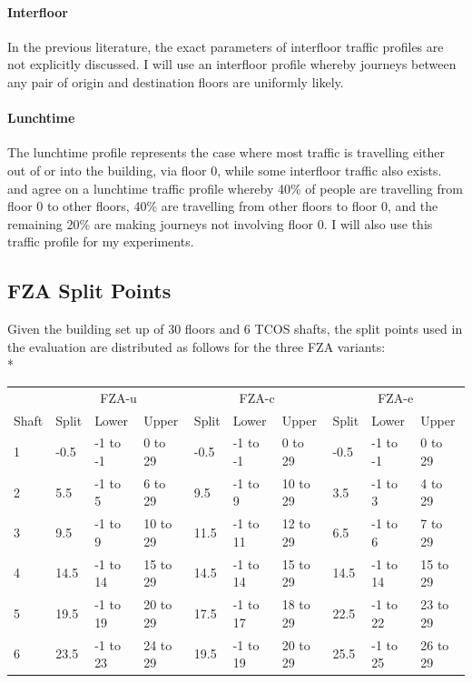 \documentclass{UoYCSproject}
\begin{document}
\paragraph{Interfloor}

In the previous literature, the exact parameters of interfloor traffic profiles are not explicitly discussed.  I will use an interfloor profile whereby journeys between any pair of origin and destination floors are uniformly likely.

\paragraph{Lunchtime}

The lunchtime profile represents the case where most traffic is travelling either out of or into the building, via floor 0, while some interfloor traffic also exists.  \citet{Rong2003} and \citet{Siikonen1993} agree on a lunchtime traffic profile whereby 40\% of people are travelling from floor 0 to other floors, 40\% are travelling from other floors to floor 0, and the remaining 20\% are making journeys not involving floor 0.  I will also use this traffic profile for my experiments.

\subsection{FZA Split Points}

Given the building set up of 30 floors and 6 TCOS shafts, the split points used in the evaluation are distributed as follows for the three FZA variants:\\*
\begin{tabular}{l || l | l | l || l | l | l || l | l | l}
		& \multicolumn{3}{c||}{FZA-u} & \multicolumn{3}{c||}{FZA-c} & \multicolumn{3}{c}{FZA-e} \\
	Shaft & Split & Lower & Upper & Split & Lower & Upper & Split & Lower & Upper \\
	\hline
	1	& -0.5	& -1 to -1	& 0 to 29	& -0.5	& -1 to -1	& 0 to 29	& -0.5	& -1 to -1	& 0 to 29 \\
	2	& 5.5	& -1 to 5	& 6 to 29	& 9.5	& -1 to 9	& 10 to 29	& 3.5	& -1 to 3	& 4 to 29 \\
	3	& 9.5	& -1 to 9	& 10 to 29	& 11.5	& -1 to 11	& 12 to 29	& 6.5	& -1 to 6	& 7 to 29 \\
	4	& 14.5	& -1 to 14	& 15 to 29	& 14.5	& -1 to 14	& 15 to 29	& 14.5	& -1 to 14	& 15 to 29 \\
	5	& 19.5	& -1 to 19	& 20 to 29	& 17.5	& -1 to 17	& 18 to 29	& 22.5	& -1 to 22	& 23 to 29 \\
	6	& 23.5	& -1 to 23	& 24 to 29	& 19.5	& -1 to 19	& 20 to 29	& 25.5	& -1 to 25	& 26 to 29
\end{tabular}
\end{document}
